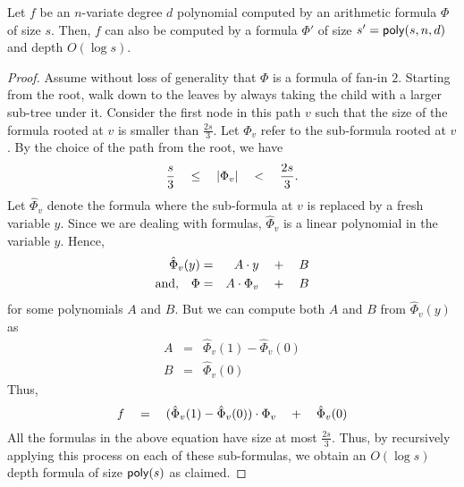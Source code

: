 \begin{lemma}
Let $f$ be an $n$-variate degree $d$ polynomial computed by an arithmetic formula $\Phi$ of size $s$. Then, $f$ can also be computed by a formula $\Phi'$ of size $s' = \mathsf{poly}(s,n,d)$ and depth $O(\log s)$. 
\end{lemma}
\begin{proof}
Assume without loss of generality that $\Phi$ is a formula of fan-in $2$. Starting from the root, walk down to the leaves by always taking the child with a larger sub-tree under it. Consider the first node in this path $v$ such that the size of the formula rooted at $v$ is smaller than $\frac{2s}{3}$. Let $\Phi_v$ refer to the sub-formula rooted at $v$. By the choice of the path from the root, we have
\[
\frac{s}{3} \quad \leq \quad \left|\Phi_v\right| \quad < \quad \frac{2s}{3}.
\]
Let $\hat{\Phi}_v$ denote the formula where the sub-formula at $v$ is replaced by a fresh variable $y$. Since we are dealing with formulas, $\hat{\Phi}_v$ is a linear polynomial in the variable $y$. Hence,
\begin{eqnarray*}
\hat{\Phi}_v(y) & = & A \cdot y \quad + \quad B\\
\text{and,}\quad \Phi & = & A \cdot \Phi_v \quad + \quad B
\end{eqnarray*}
for some polynomials $A$ and $B$. But we can compute both $A$ and $B$ from $\hat{\Phi}_v(y)$ as
\begin{eqnarray*}
A & = & \hat{\Phi}_v(1) - \hat{\Phi}_v(0)\\
B & = & \hat{\Phi}_v(0)
\end{eqnarray*}
Thus, 
\[
f \quad = \quad (\hat{\Phi}_v(1) - \hat{\Phi}_v(0))\cdot \Phi_v \quad + \quad \hat{\Phi}_v(0)
\]
All the formulas in the above equation have size at most $\frac{2s}{3}$. Thus, by recursively applying this process on each of these sub-formulas, we obtain an $O(\log s)$ depth formula of size $\mathsf{poly}(s)$ as claimed. 
\end{proof}



